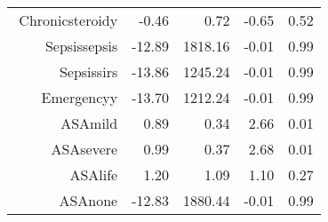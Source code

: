 \begin{tabular}{rrrrr}
$$  Chronic\-steroid\-y & -0.46 & 0.72 & -0.65 & 0.52 \\ 
  Sepsis\-sepsis & -12.89 & 1818.16 & -0.01 & 0.99 \\ 
  Sepsis\-sirs & -13.86 & 1245.24 & -0.01 & 0.99 \\ 
  Emergency\-y & -13.70 & 1212.24 & -0.01 & 0.99 \\ 
  ASA\-mild & 0.89 & 0.34 & 2.66 & 0.01 \\ 
  ASA\-severe & 0.99 & 0.37 & 2.68 & 0.01 \\ 
  ASA\-life & 1.20 & 1.09 & 1.10 & 0.27 \\ 
  ASA\-none & -12.83 & 1880.44 & -0.01 & 0.99 \\ 
   \hline
\end{tabular}

